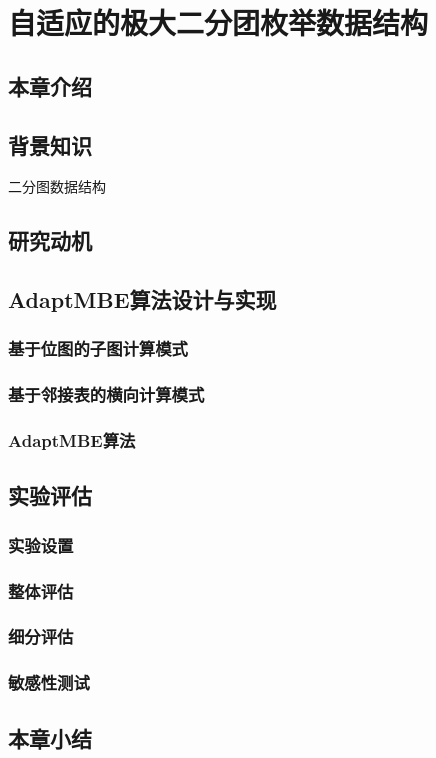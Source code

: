 \chapter{自适应的极大二分团枚举数据结构}
\label{ch:adapt_mbe}

\section{本章介绍}
\section{背景知识}
二分图数据结构

\section{研究动机}

\section{AdaptMBE算法设计与实现}

\subsection{基于位图的子图计算模式}

\subsection{基于邻接表的横向计算模式}

\subsection{AdaptMBE算法}

\section{实验评估}

\subsection{实验设置}

\subsection{整体评估}

\subsection{细分评估}

\subsection{敏感性测试}

\section{本章小结}